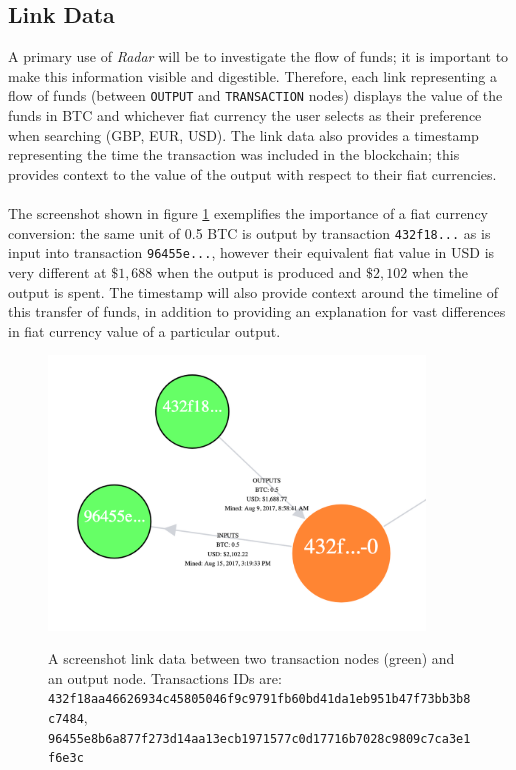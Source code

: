 \subsection{Link Data}
A primary use of \textit{Radar} will be to investigate the flow of funds; it is important to make this information visible and digestible. Therefore, each link representing a flow of funds (between \texttt{OUTPUT} and \texttt{TRANSACTION} nodes) displays the value of the funds in BTC and whichever fiat currency the user selects as their preference when searching (GBP, EUR, USD). The link data also provides a timestamp representing the time the transaction was included in the blockchain; this provides context to the value of the output with respect to their fiat currencies. 
\\\\
The screenshot shown in figure \ref{fig:link-data} exemplifies the importance of a fiat currency conversion: the same unit of 0.5 BTC is output by transaction \texttt{432f18...} as is input into transaction \texttt{96455e...}, however their equivalent fiat value in USD is very different at $\$1,688$ when the output is produced and $\$2,102$ when the output is spent. The timestamp will also provide context around the timeline of this transfer of funds, in addition to providing an explanation for vast differences in fiat currency value of a particular output.

\begin{figure}[h!]
  \centering
  \includegraphics[width = 10cm]{./figures/ui-screenshots/link-data}\\[0.5cm] 
  \caption{A screenshot link data between two transaction nodes (green) and an output node. 
  Transactions IDs are: \texttt{432f18aa46626934c45805046f9c9791fb60bd41da1eb951b47f73bb3b8c7484},\\\texttt{96455e8b6a877f273d14aa13ecb1971577c0d17716b7028c9809c7ca3e1f6e3c}}
  \label{fig:link-data}
\end{figure}

